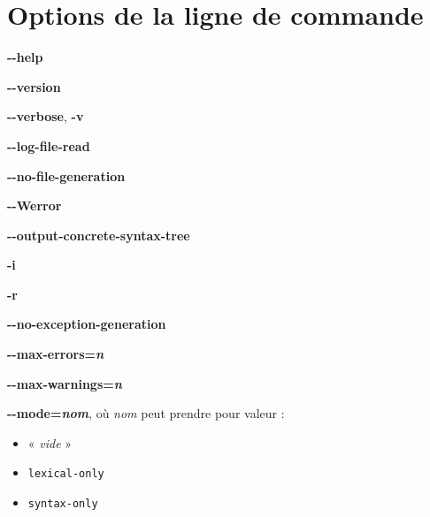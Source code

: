 




\chapter{Options de la ligne de commande}


\textbf{-{}-help}


\textbf{-{}-version}


\textbf{-{}-verbose}, \textbf{-v}


\textbf{-{}-log-file-read}



\textbf{-{}-no-file-generation}




\textbf{-{}-Werror}





\textbf{-{}-output-concrete-syntax-tree}






\textbf{-i}







\textbf{-r}







\textbf{-{}-no-exception-generation}








\textbf{-{}-max-errors=\emph{n}}









\textbf{-{}-max-warnings=\emph{n}}


\textbf{-{}-mode=\emph{nom}}, où \emph{nom} peut prendre pour valeur :
\begin{itemize}
  \item « \emph{vide} »
  \item \texttt{lexical-only}
  \item \texttt{syntax-only}
\end{itemize}


